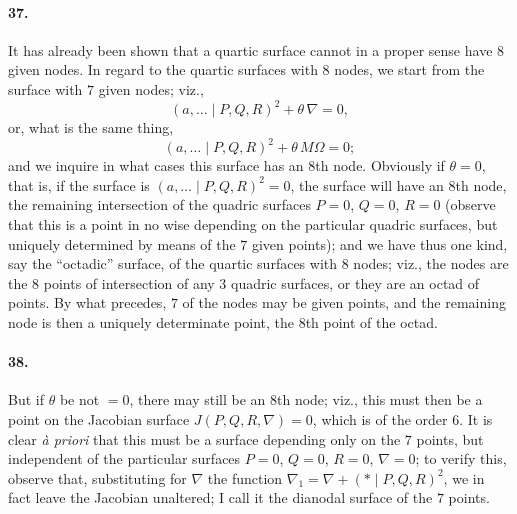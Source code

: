 \documentclass[11pt,a4paper]{article}
\begin{document}
\paragraph{37.}
It has already been shown that a quartic surface cannot in a proper sense have $8$ given
nodes. In regard to the quartic surfaces with $8$ nodes, we start from the surface with
$7$ given nodes; viz.,
\[
(a, \ldots  \mid P, Q, R)^2 + \theta\,\nabla = 0,
\]
or, what is the same thing,
\[
(a, \ldots  \mid P, Q, R)^2 + \theta\,M \Omega = 0;
\]
and we inquire in what cases this surface has an $8$th node. Obviously if $\theta = 0$,
that is, if the surface is $(a, \ldots  \mid P, Q, R)^2 = 0$, the surface will have an
$8$th node, the remaining intersection of the quadric surfaces $P = 0$, $Q = 0$, $R = 0$
(observe that this is a point in no wise depending on the particular quadric surfaces, but
uniquely determined by means of the $7$ given points); and we have thus one kind, say the
``octadic'' surface, of the quartic surfaces with $8$ nodes; viz., the nodes are the $8$
points of intersection of any $3$ quadric surfaces, or they are an octad of points. By what
precedes, $7$ of the nodes may be given points, and the remaining node is then a uniquely
determinate point, the $8$th point of the octad.

\paragraph{38.}
But if $\theta$ be not $= 0$, there may still be an $8$th node; viz., this must then be a
point on the Jacobian surface $J(P, Q, R, \nabla) = 0$, which is of the order $6$. It is
clear \textit{\`a priori} that this must be a surface depending only on the $7$ points, but
independent of the particular surfaces $P = 0$, $Q = 0$, $R = 0$, $\nabla = 0$; to verify
this, observe that, substituting for $\nabla$ the function $\nabla_1 = \nabla + (* \mid P, Q, R)^2$,
we in fact leave the Jacobian unaltered; I call it the dianodal surface of the $7$ points.
\end{document}
